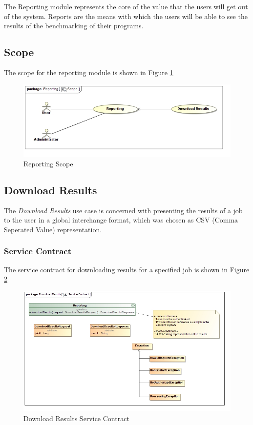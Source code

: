The Reporting module represents the core of the value that the users will
get out of the system. Reports are the means with which the users will
be able to see the results of the benchmarking of their programs.

\subsection{Scope}
The scope for the reporting module is shown in Figure \ref{fig:reportingScope}
\begin{figure}[H]
  \begin{center}
  \includegraphics[scale=0.38]{../Diagrams and Charts/Reporting/Scope.jpg}
  \caption{Reporting Scope}
  \label{fig:reportingScope}
  \end{center}
\end{figure}


\subsection {Download Results}
The \textit{Download Results} use case is concerned with presenting the results
of a job to the user in a global interchange format, which was chosen
as CSV (Comma Seperated Value) representation.

\subsubsection{Service Contract}
The service contract for downloading results for a specified job is shown in 
Figure \ref{fig:downloadResultsServiceContract}
\begin{figure}[H]
  \begin{center}
  \includegraphics[scale=0.38]{../Diagrams and Charts/Reporting/Download Results Service Contract.jpg}
  \caption{Download Results Service Contract}
  \label{fig:downloadResultsServiceContract}
  \end{center}
\end{figure}


